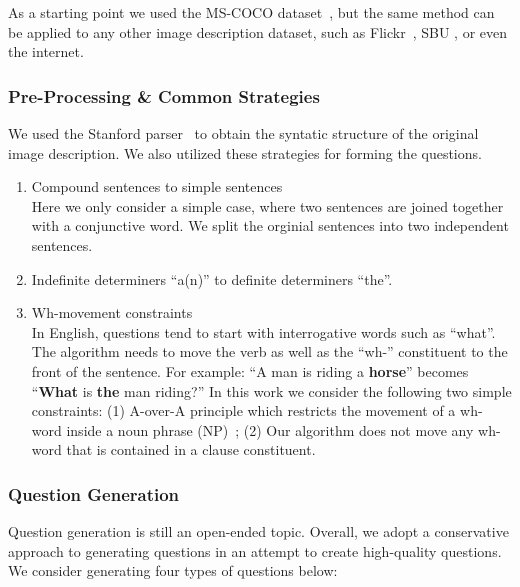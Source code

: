 As a starting point we used
the MS-COCO dataset~\cite{mscoco}, but the same method can be applied to any
other image description dataset, such as Flickr~\cite{flickr8k}, SBU
\cite{ordonez11}, or even the internet.

\subsubsection{Pre-Processing \& Common Strategies}
We used the Stanford parser~\cite{klein03} to obtain the syntatic structure of
the original image description. We also utilized these strategies for forming
the questions.

\begin{enumerate}[leftmargin=*]
\item Compound sentences to simple sentences \\ Here we only consider a simple
case, where two sentences are joined together with a conjunctive word. We split
the orginial sentences into two independent sentences.

\item Indefinite determiners ``a(n)'' to definite determiners ``the''.

\item Wh-movement constraints \\ In English, questions tend to start with
interrogative words such as ``what''. The algorithm needs to move the verb as
well as the ``wh-'' constituent to the front of the sentence. For example: ``A
man is riding a \textbf{horse}'' becomes   ``\textbf{What} is \textbf{the} man
riding?'' In this work we consider the following two simple constraints: (1)
A-over-A principle which restricts the movement of a wh-word inside a noun
phrase (NP)~\cite{chomsky73}; (2) Our algorithm does not move any wh-word that
is contained in a clause constituent.
\end{enumerate}

\subsubsection{Question Generation}
Question generation is still an open-ended topic. Overall, we adopt a conservative 
approach to generating questions in an attempt to create high-quality questions. We 
consider generating four types of questions below:

